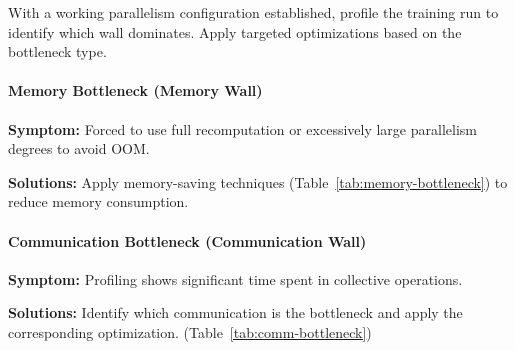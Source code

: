 With a working parallelism configuration established, profile the training run to identify which wall dominates. Apply targeted optimizations based on the bottleneck type.

\paragraph*{Memory Bottleneck (Memory Wall)}
\textbf{Symptom:} Forced to use full recomputation or excessively large parallelism degrees to avoid OOM.

\noindent\textbf{Solutions:} Apply memory-saving techniques (Table~\ref{tab:memory-bottleneck}) to reduce memory consumption.

\begin{table}[ht]
\centering
\caption{Memory bottleneck solutions.}
\label{tab:memory-bottleneck}
\end{table}

\paragraph*{Communication Bottleneck (Communication Wall)}
\textbf{Symptom:} Profiling shows significant time spent in collective operations.

\noindent\textbf{Solutions:} Identify which communication is the bottleneck and apply the corresponding optimization. (Table~\ref{tab:comm-bottleneck})

